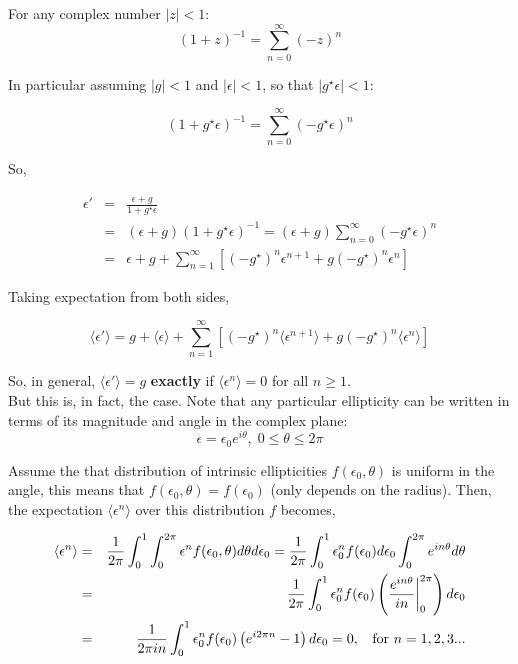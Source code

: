 \documentclass[12pt]{article}
\begin{document}
For any complex number $\left \vert z \right \vert < 1 $: 
\[
(1 + z)^{-1} = \sum_{n=0}^{\infty}  \left(-z\right)^{n}
\]

In particular assuming $\left \vert g \right \vert < 1$ and $\left \vert \epsilon \right \vert < 1$, so that $\left \vert g^{\star}\epsilon \right \vert < 1 $: 

\[
\left(1 + g^{\star}\epsilon\right)^{-1} = \sum_{n=0}^{\infty} \left(-g^{\star} \epsilon\right)^{n}
\]

So, 

\begin{eqnarray*}
\epsilon' &=& \frac{\epsilon + g }{1 + g^{\star}\epsilon}\\
&=&\left(\epsilon + g \right) \left(1 + g^{\star}\epsilon\right)^{-1} = \left(\epsilon + g \right)\sum_{n=0}^{\infty} \left(-g^{\star} \epsilon\right)^{n} \\
&=& \epsilon + g + \sum_{n=1}^{\infty} \left[ \left(-g^{\star}\right)^{n} \epsilon^{n+1} + g (-g^{\star})^{n} \epsilon^{n} \right] 
\end{eqnarray*}

Taking expectation from both sides, 

\[
\langle \epsilon' \rangle =  g + \langle \epsilon \rangle + \sum_{n=1}^{\infty} \left[ \left(-g^{\star}\right)^{n} \langle \epsilon^{n+1} \rangle + g (-g^{\star})^{n} \langle \epsilon^{n} \rangle \right] 
\]

So, in general, $\langle \epsilon' \rangle  = g$ \textbf{exactly} if $\langle \epsilon^{n}\rangle = 0 $ for all $n \geq 1$.  \\

But this is, in fact, the case. Note that any particular ellipticity can be written in terms of its magnitude and angle in the complex plane: 
\[
\epsilon = \epsilon_{0} e^{i\theta}, \; 0 \leq \theta \leq 2 \pi 
\]


Assume the that distribution of intrinsic ellipticities $f\left(\epsilon_{0}, \theta \right) $ is uniform in the angle, this means that $ f\left(\epsilon_{0}, \theta \right) = f\left(\epsilon_{0}\right)$ (only depends on the radius). 
Then, the expectation $ \langle \epsilon^{n} \rangle$ over this distribution $f$ becomes, 

\begin{eqnarray*}
\langle  \epsilon^{n} \rangle &=& {1 \over 2\pi}   \int_{0}^{1} \int_{0}^{2\pi} \epsilon^{n} f(\epsilon_{0}, \theta)  d\theta d \epsilon_{0} = {1 \over 2\pi}  \int_{0}^{1} \epsilon_{0}^{n} f(\epsilon_{0}) d\epsilon_{0} \int_{0}^{2\pi} e^{in \theta} d\theta   \\
&=& {1 \over 2\pi}  \int_{0}^{1} \epsilon_{0}^{n} f(\epsilon_{0}) \left( \frac{e^{in \theta}}{in} \biggr \rvert^{2\pi}_{0} \right) d\epsilon_{0} \\ 
&=&  {1 \over 2\pi i n }  \int_{0}^{1} \epsilon_{0}^{n} f(\epsilon_{0}) \left(e^{i 2\pi n} - 1 \right) d\epsilon_{0}   = 0 , \; \; \text{ for $n = 1,2,3...$}
\end{eqnarray*}
\end{document}
